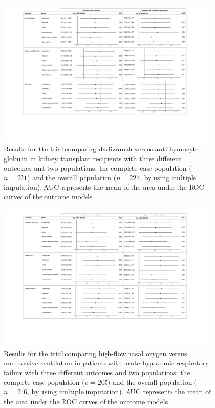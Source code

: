 \documentclass{article}
\begin{document}
\begin{figure}
    \centering
    \includegraphics[width=\textheight , trim=5cm 5cm 5cm 1cm,clip]{figures/TAXI.pdf}
    \caption{Results for the trial comparing daclizumab versus antithymocyte globulin in kidney transplant recipients with three different outcomes and two  populations: the complete case population ($n=221$) and the overall population ($n=227$, by using multiple imputation). AUC represents the mean of the area under the ROC curves of the outcome models}\label{sfig1}
\end{figure}


 \begin{figure}
    \centering
    \includegraphics[width=\textheight , trim=5cm 5cm 5cm 1cm,clip]{figures/NVIvsOHD.pdf}
    \caption{Results for the trial comparing high-flow nasal oxygen versus noninvasive ventilation in patients with acute hypoxemic respiratory failure with three different outcomes and two populations: the complete case population ($n=205$) and the overall population ($n=216$, by using multiple imputation). AUC represents the mean of the area under the ROC curves of the outcome models}\label{sfig3}
\end{figure}
\end{document}
